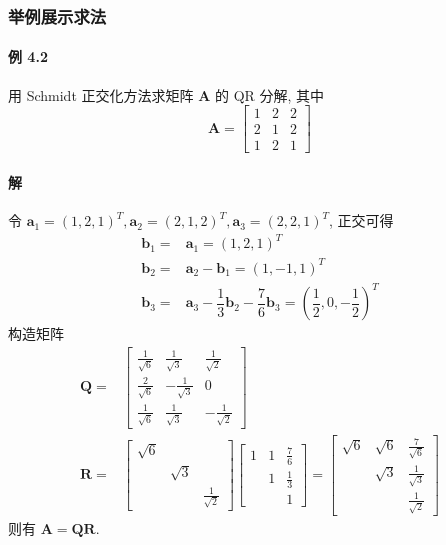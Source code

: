 \subsubsection{举例展示求法}

\paragraph*{例 4.2} 用 Schmidt 正交化方法求矩阵 $\bm{A}$ 的 QR 分解, 其中
$$
    \bm{A} = \begin{bmatrix}
        1 & 2 & 2 \\
        2 & 1 & 2 \\
        1 & 2 & 1
    \end{bmatrix}
$$

\paragraph*{解} 令 $\bm{a}_1 = (1, 2, 1)^T, \bm{a}_2 = (2, 1, 2)^T, \bm{a}_3 = (2, 2, 1)^T$, 正交可得
\begin{align*}
    \bm{b}_1 = & \bm{a}_1 = (1, 2, 1)^T                                                                      \\
    \bm{b}_2 = & \bm{a}_2 - \bm{b}_1 = (1, -1, 1)^T                                                          \\
    \bm{b}_3 = & \bm{a}_3 - \dfrac{1}{3}\bm{b}_2 - \dfrac{7}{6}\bm{b}_3 = (\dfrac{1}{2}, 0, -\dfrac{1}{2})^T
\end{align*}
构造矩阵
\begin{align*}
    \bm{Q} = & \begin{bmatrix}
                   \frac{1}{\sqrt{6}} & \frac{1}{\sqrt{3}}  & \frac{1}{\sqrt{2}}  \\
                   \frac{2}{\sqrt{6}} & -\frac{1}{\sqrt{3}} & 0                   \\
                   \frac{1}{\sqrt{6}} & \frac{1}{\sqrt{3}}  & -\frac{1}{\sqrt{2}}
               \end{bmatrix} \\
    \bm{R} = & \begin{bmatrix}
                   \sqrt{6} &          &                    \\
                            & \sqrt{3} &                    \\
                            &          & \frac{1}{\sqrt{2}}
               \end{bmatrix}
    \begin{bmatrix}
        1 & 1 & \frac{7}{6} \\
          & 1 & \frac{1}{3} \\
          &   & 1
    \end{bmatrix} =
    \begin{bmatrix}
        \sqrt{6} & \sqrt{6} & \frac{7}{\sqrt{6}} \\
                 & \sqrt{3} & \frac{1}{\sqrt{3}} \\
                 &          & \frac{1}{\sqrt{2}}
    \end{bmatrix}
\end{align*}
则有 $\bm{A} = \bm{QR}$.

